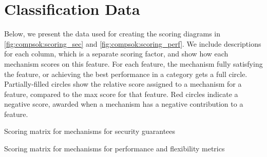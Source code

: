 
\section{Classification Data}
\label{app:compsok:data}

Below, we present the data used for creating the scoring diagrams in
\autoref{fig:compsok:scoring_sec} and \autoref{fig:compsok:scoring_perf}.
We include descriptions for each column, which is a separate scoring factor,
and show how each mechanism scores on this feature.
For each feature, the mechanism fully satisfying the feature, or achieving
the best performance in a category gets a full circle.
Partially-filled circles show the relative score assigned to a mechanism 
for a feature, compared to the max score for that feature.
Red circles indicate a negative score, awarded when a mechanism has a
negative contribution to a feature.

\begin{sidewaystable*}
  \centering
  
	\caption[Scoring matrix for mechanisms for security guarantees]
          {Scoring matrix for mechanisms for security guarantees}
	\label{tab:compsok:app_sec}
\end{sidewaystable*}

\begin{table*}
  \centering
  
	\caption[Scoring matrix for mechanisms for performance and flexibility metrics]
          {Scoring matrix for mechanisms for performance and flexibility metrics}
	\label{tab:compsok:app_perf}
\end{table*}
